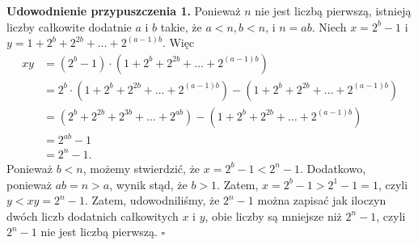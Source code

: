 \documentclass[12pt, a4paper]{article}
\begin{document}
\noindent \textbf{Udowodnienie przypuszczenia 1.} Ponieważ $n$ nie jest liczbą pierwszą, istnieją liczby całkowite
dodatnie $a$ i $b$ takie, że $a < n, b < n$, i $n = ab$. Niech $x = 2^b - 1$ i $y = 1 + 2^b + 2^{2b} + \dots + 2^{\left(a-1\right)b}$.
Więc
\begin{align*}
  xy &= \left(2^b -1\right) \cdot \left(1 + 2^b + 2^{2b} + \dots + 2^{\left(a - 1\right)b}\right) \\
     &= 2^b \cdot \left(1 + 2^b + 2^{2b} + \dots + 2^{\left(a-1\right)b}\right) - \left(1 + 2^b + 2^{2b} + \dots + 2^{\left(a-1\right)b}\right) \\
     &= \left(2^b + 2^{2b} + 2^{3b} + \dots + 2^{ab}\right) - \left(1 + 2^b + 2^{2b} + \dots + 2^{\left(a - 1\right)b}\right) \\
     &= 2^{ab} - 1 \\
     &= 2^n - 1.
\end{align*}
Ponieważ $b < n$, możemy stwierdzić, że $x = 2^b - 1 < 2^n - 1$. Dodatkowo, ponieważ $ab = n > a$, wynik stąd, że $b > 1$.
Zatem, $x = 2^b - 1 > 2^1 -1 = 1$, czyli $y < xy = 2^n - 1$. Zatem, udowodniliśmy, że $2^n - 1$ można zapisać jak iloczyn
dwóch liczb dodatnich całkowitych $x$ i $y$, obie liczby są mniejsze niż $2^n - 1$, czyli $2^n - 1$ nie jest liczbą pierwszą. \hfill $\square$
\end{document}
